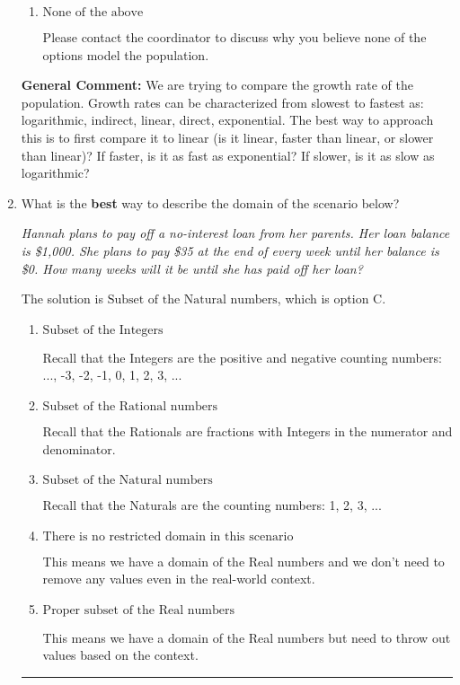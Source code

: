 \documentclass{extbook}[14pt]
\newcommand{\litem}[1]{\item #1

\rule{\textwidth}{0.4pt}}
\begin{document}
\begin{enumerate}
{\begin{enumerate}[label=\Alph*.]
This suggests the fastest of growths that we know.
\item \( \text{None of the above} \)

Please contact the coordinator to discuss why you believe none of the options model the population.
\end{enumerate}

\textbf{General Comment:} We are trying to compare the growth rate of the population. Growth rates can be characterized from slowest to fastest as: logarithmic, indirect, linear, direct, exponential. The best way to approach this is to first compare it to linear (is it linear, faster than linear, or slower than linear)? If faster, is it as fast as exponential? If slower, is it as slow as logarithmic?
}
\litem{
What is the \textbf{best} way to describe the domain of the scenario below?

\begin{center}
    \textit{ Hannah plans to pay off a no-interest loan from her parents. Her loan balance is \$1,000. She plans to pay \$35 at the end of every week until her balance is \$0. How many weeks will it be until she has paid off her loan? }
\end{center}
The solution is \( \text{Subset of the Natural numbers} \), which is option C.\begin{enumerate}[label=\Alph*.]
\item \( \text{Subset of the Integers} \)

Recall that the Integers are the positive and negative counting numbers: ..., -3, -2, -1, 0, 1, 2, 3, ... 
\item \( \text{Subset of the Rational numbers} \)

Recall that the Rationals are fractions with Integers in the numerator and denominator.
\item \( \text{Subset of the Natural numbers} \)

Recall that the Naturals are the counting numbers: 1, 2, 3, ...
\item \( \text{There is no restricted domain in this scenario} \)

This means we have a domain of the Real numbers and we don't need to remove any values even in the real-world context.
\item \( \text{Proper subset of the Real numbers} \)

This means we have a domain of the Real numbers but need to throw out values based on the context.
\end{enumerate}

}
\end{enumerate}
\end{document}
